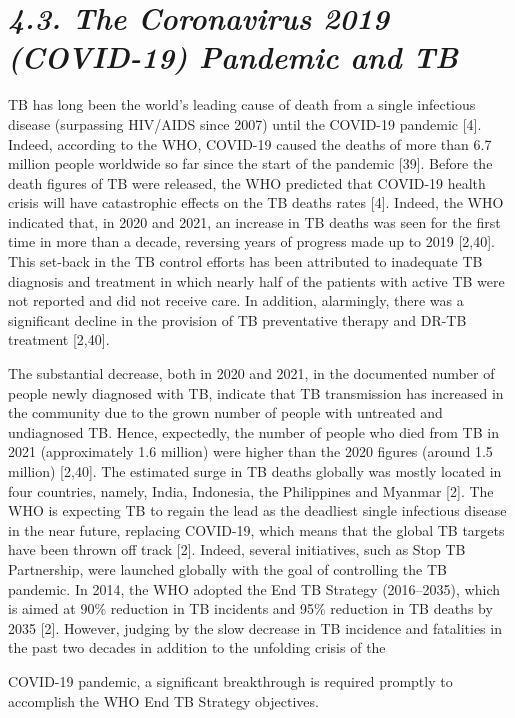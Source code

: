 \documentclass{article}
\begin{document}
\section{\textit{4.3. The Coronavirus 2019 (COVID-19) Pandemic and TB}}

TB has long been the world's leading cause of death from a single infectious disease (surpassing HIV/AIDS since 2007) until the COVID-19 pandemic [4]. Indeed, according to the WHO, COVID-19 caused the deaths of more than 6.7 million people worldwide so far since the start of the pandemic [39]. Before the death figures of TB were released, the WHO predicted that COVID-19 health crisis will have catastrophic effects on the TB deaths rates [4]. Indeed, the WHO indicated that, in 2020 and 2021, an increase in TB deaths was seen for the first time in more than a decade, reversing years of progress made up to 2019 [2,40]. This set-back in the TB control efforts has been attributed to inadequate TB diagnosis and treatment in which nearly half of the patients with active TB were not reported and did not receive care. In addition, alarmingly, there was a significant decline in the provision of TB preventative therapy and DR-TB treatment [2,40].

The substantial decrease, both in 2020 and 2021, in the documented number of people newly diagnosed with TB, indicate that TB transmission has increased in the community due to the grown number of people with untreated and undiagnosed TB. Hence, expectedly, the number of people who died from TB in 2021 (approximately 1.6 million) were higher than the 2020 figures (around 1.5 million) [2,40]. The estimated surge in TB deaths globally was mostly located in four countries, namely, India, Indonesia, the Philippines and Myanmar [2]. The WHO is expecting TB to regain the lead as the deadliest single infectious disease in the near future, replacing COVID-19, which means that the global TB targets have been thrown off track [2]. Indeed, several initiatives, such as Stop TB Partnership, were launched globally with the goal of controlling the TB pandemic. In 2014, the WHO adopted the End TB Strategy (2016–2035), which is aimed at 90\% reduction in TB incidents and 95\% reduction in TB deaths by 2035 [2]. However, judging by the slow decrease in TB incidence and fatalities in the past two decades in addition to the unfolding crisis of the

COVID-19 pandemic, a significant breakthrough is required promptly to accomplish the WHO End TB Strategy objectives.
\end{document}
